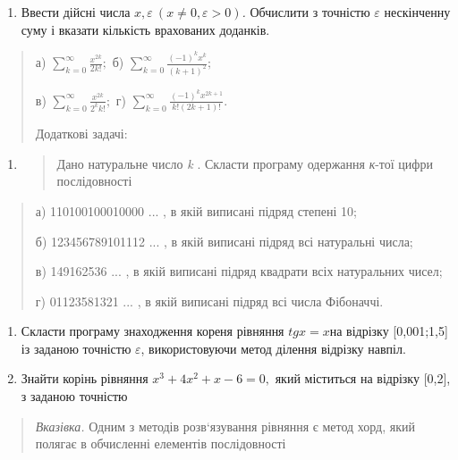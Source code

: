 \documentclass[]{article}
\begin{document}
\begin{enumerate}
\def\labelenumi{\arabic{enumi})}
\item
  Ввести дійсні числа
  \(x,\varepsilon\ (x \neq 0,\varepsilon > 0)\)\emph{.} Обчислити з
  точністю \(\varepsilon\) нескінченну суму і вказати кількість
  врахованих доданків.
\end{enumerate}

\begin{quote}
а) \(\sum_{k = 0}^{\infty}\frac{x^{2k}}{2k!};\) б)
\(\sum_{k = 0}^{\infty}\frac{( - 1)^{k}x^{k}}{(k + 1)^{2}};\)

в) \(\sum_{k = 0}^{\infty}\frac{x^{2k}}{2^{k}k!};\) г)
\(\sum_{k = 0}^{\infty}\frac{( - 1)^{k}x^{2k + 1}}{k!(2k + 1)!}.\)

Додаткові задачі:
\end{quote}

\begin{enumerate}
\def\labelenumi{\arabic{enumi})}
\item
  \begin{quote}
  Дано натуральне число \emph{k} . Скласти програму одержання
  \emph{к}-тої цифри послідовності
  \end{quote}
\end{enumerate}

\begin{quote}
а) 110100100010000 ... , в якій виписані підряд степені 10;

б) 123456789101112 ... , в якій виписані підряд всі натуральні числа;

в) 149162536 ... , в якій виписані підряд квадрати всіх натуральних
чисел;

г) 01123581321 ... , в якій виписані підряд всі числа Фібоначчі.
\end{quote}

\begin{enumerate}
\def\labelenumi{\arabic{enumi})}
\item
  Скласти програму знаходження кореня рівняння \(tgx = x\)на відрізку
  {[}0,001;1,5{]} із заданою точністю \(\varepsilon\), використовуючи
  метод ділення відрізку навпіл.
\item
  Знайти корінь рівняння \(x^{3} + 4x^{2} + x - 6 = 0,\) який міститься
  на відрізку {[}0,2{]}, з заданою точністю
\end{enumerate}

\begin{quote}
\emph{\emph{Вказівка.}} Одним з методів розв`язування рівняння є метод
хорд, який полягає в обчисленні елементів послідовності
\end{quote}
\end{document}
